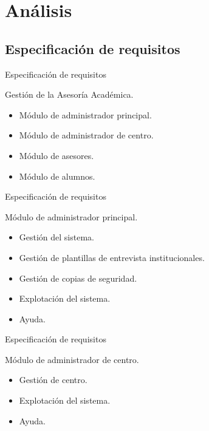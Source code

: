 \documentclass[10pt, hyperref={pdfpagelabels=false}]{beamer}
\begin{document}
  \section{Análisis}
    \subsection{Especificación de requisitos}
      \begin{frame}{Especificación de requisitos}
        \begin{block}{Gestión de la Asesoría Académica.}
          \begin{itemize}
           \item Módulo de administrador principal.
           \item Módulo de administrador de centro.
           \item Módulo de asesores.
           \item Módulo de alumnos.
          \end{itemize}
        \end{block}
      \end{frame}

      \begin{frame}{Especificación de requisitos}
        \begin{block}{Módulo de administrador principal.}
          \begin{itemize}
           \item Gestión del sistema.
           \item Gestión de plantillas de entrevista institucionales.
           \item Gestión de copias de seguridad.
           \item Explotación del sistema.
           \item Ayuda.
          \end{itemize}
        \end{block}
      \end{frame}

      \begin{frame}{Especificación de requisitos}
        \begin{block}{Módulo de administrador de centro.}
          \begin{itemize}
           \item Gestión de centro.
           \item Explotación del sistema.
           \item Ayuda.
          \end{itemize}
        \end{block}
      \end{frame}
\end{document}
